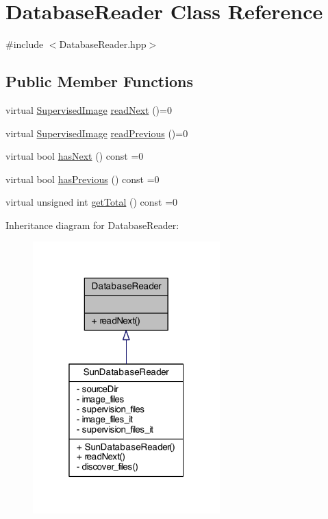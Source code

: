 \hypertarget{class_database_reader}{\section{Database\+Reader Class Reference}
\label{class_database_reader}
}


{\ttfamily \#include $<$Database\+Reader.\+hpp$>$}

\subsection*{Public Member Functions}
\begin{DoxyCompactItemize}
\item 
virtual \hyperlink{class_supervised_image}{Supervised\+Image} \hyperlink{class_database_reader_a4bf8a5faaaeaa057050e9c7ca4370081}{read\+Next} ()=0
\item 
virtual \hyperlink{class_supervised_image}{Supervised\+Image} \hyperlink{class_database_reader_a762e5d499c9d60e5ba85344c1c7c2c8c}{read\+Previous} ()=0
\item 
virtual bool \hyperlink{class_database_reader_a406c8a783b41f31a273ed9c761bf33fe}{has\+Next} () const =0
\item 
virtual bool \hyperlink{class_database_reader_acc71ed6c7af71bdc66b4b6eee3598506}{has\+Previous} () const =0
\item 
virtual unsigned int \hyperlink{class_database_reader_abd37fa505553101bd8e18fd52547b7ee}{get\+Total} () const =0
\end{DoxyCompactItemize}


Inheritance diagram for Database\+Reader\+:\nopagebreak
\begin{figure}[H]
\begin{center}
\leavevmode
\includegraphics[width=205pt]{class_database_reader__inherit__graph}
\end{center}
\end{figure}


